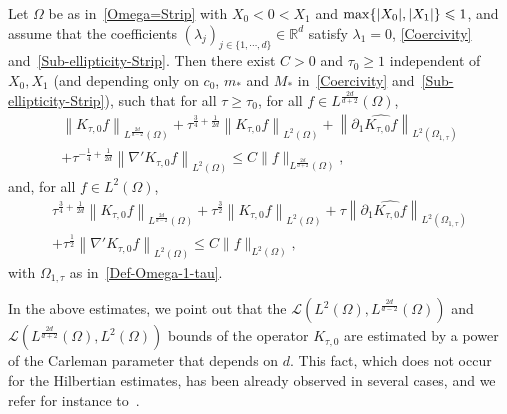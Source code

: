 \documentclass[AHL,Unicode,longabstracts]{cedram}
\newcommand{\scL}{\mathscr{L}}
\newcommand*\R{\mathbb{R}}
\renewcommand{\leq}{\leqslant}
\renewcommand{\geq}{\geqslant}
\begin{document}
\begin{prop}\label{Prop-OpNorm-Est-K0}
Let $\Omega$ be as in~\eqref{Omega=Strip} with $X_0 \! <\! 0\! <\! X_1$ and $\max\{|X_0|, |X_1|\}\linebreak \leq 1$, and assume that the coefficients $(\lambda_j)_{j \in \{1,\cdots,d\}} \in \R^d$ satisfy $\lambda_1 = 0$, \eqref{Coercivity} and~\eqref{Sub-ellipticity-Strip}. Then there exist $C>0$ and $\tau_0 \geq 1$ independent of $X_0, X_1$ (and depending only on $c_0$, $m_*$ and $M_*$ in~\eqref{Coercivity} and~\eqref{Sub-ellipticity-Strip}), such that for all $\tau \geq \tau_0$, for all $f \in L^{\frac{2d}{d+2}}(\Omega)$,
\begin{multline}\label{Est-K-tau-0-f-L-2_*}
\left\| K_{\tau,0} f\right\|_{L^{\frac{2d}{d-2}}(\Omega)} +
\tau^{\frac{3}{4}+\frac{1}{2d}}\left \| K_{\tau,0} f\right\|_{L^{2}(\Omega)} +
\left\| \partial_1 \widehat{ K_{\tau,0} f}\right\|_{L^2(\Omega_{1, \tau})}\\
+
\tau^{-\frac{1}{4} +\frac{1}{2d}} \left\| \nabla' K_{\tau,0} f\right\|_{L^2(\Omega)}
\leq C \| f \|_{L^{\frac{2d}{d+2}}(\Omega)},
\end{multline}
and, for all $f \in L^2(\Omega)$,
\begin{multline}\label{Est-K-tau-0-f-L-2}
\tau^{\frac{3}{4}+\frac{1}{2d}} \left\| K_{\tau,0} f\right\|_{L^{\frac{2d}{d-2}}(\Omega)} +
\tau^{\frac{3}{2}} \left\| K_{\tau,0} f\right\|_{L^{2}(\Omega)} +
\tau
\left\| \partial_1 \widehat{ K_{\tau,0} f}\right\|_{L^2(\Omega_{1, \tau})} \\
+
\tau^{\frac{1}{2}} \left\| \nabla' K_{\tau,0} f\right\|_{L^2(\Omega)}
\leq C \| f \|_{L^2(\Omega)},
\end{multline}
with $\Omega_{1, \tau}$ as in~\eqref{Def-Omega-1-tau}.
\end{prop}
\begin{rema}
In the above estimates, we point out that the $\scL(L^2(\Omega),L^{\frac{2d}{d-2}}(\Omega))$ and $\scL(L^{\frac{2d}{d+2}}(\Omega),L^2(\Omega))$ bounds of the operator $K_{\tau,0}$ are estimated by a power of the Carleman parameter that depends on $d$. This fact, which does not occur for the Hilbertian estimates, has been already observed in several cases, and we refer for instance to~\cite{barcelo1988weighted, koch2001carleman, koch2005dispersive, Sogge1989uniquecontinuation}.
\end{rema}
\end{document}
